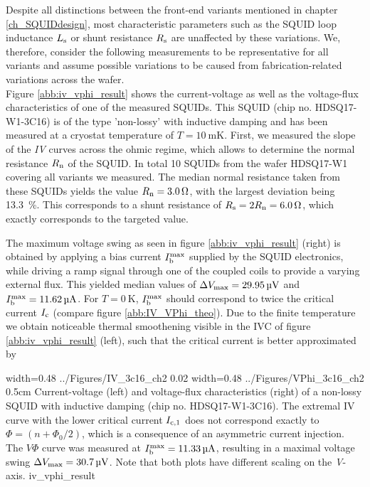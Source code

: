 Despite all distinctions between the front-end variants mentioned in chapter \ref{ch_SQUIDdesign}, most characteristic parameters such as the SQUID loop inductance $L_{\rm s}$ or shunt resistance $R_{\rm s}$ are unaffected by these variations. We, therefore, consider the following measurements to be representative for all variants and assume possible variations to be caused from fabrication-related variations across the wafer. \\
Figure \ref{abb:iv_vphi_result} shows the current-voltage as well as the voltage-flux characteristics of one of the measured SQUIDs. This SQUID (chip no. HDSQ17-W1-3C16) is of the type 'non-lossy' with inductive damping and has been measured at a cryostat temperature of $T=\qty{10}{\milli\kelvin}$. First, we measured the slope of the \textit{IV} curves across the ohmic regime, which allows to determine the normal resistance $R_{\rm n}$ of the SQUID. In total 10 SQUIDs from the wafer HDSQ17-W1 covering all variants we measured. The median normal resistance taken from these SQUIDs yields the value $R_{\rm n}=\qty{3.0}{\ohm}$, with the largest deviation being \qty{13.3}{\percent}. This corresponds to a shunt resistance of $R_{\rm s}=2R_{\rm n}=\qty{6.0}{\ohm}$, which exactly corresponds to the targeted value. 

The maximum voltage swing as seen in figure \ref{abb:iv_vphi_result} (right) is obtained by applying a bias current $I_{\rm b}^{\rm max}$ supplied by the SQUID electronics, while driving a ramp signal through one of the coupled coils to provide a varying external flux. This yielded median values of $\Delta V_{\rm max}=\qty{29.95}{\micro\volt}$ and $I_{\rm b}^{\rm max}=\qty{11.62}{\micro\ampere}$. For $T=\qty{0}{\kelvin}$, $I_{\rm b}^{\rm max}$ should correspond to twice the critical current $I_{\rm c}$ (compare figure \ref{abb:IV_VPhi_theo}). Due to the finite temperature we obtain noticeable thermal smoothening visible in the IVC of figure \ref{abb:iv_vphi_result} (left), such that the critical current is better approximated by \cite{Drung1996}

{width=0.48\textwidth}
{../Figures/IV_3c16_ch2}
{0.02\textwidth} %
{width=0.48\textwidth}
{../Figures/VPhi_3c16_ch2}
{0.5cm} %
{Current-voltage (left) and voltage-flux characteristics (right) of a non-lossy SQUID with inductive damping (chip no. HDSQ17-W1-3C16). 
The extremal IV curve with the lower critical current $I_{\rm c,1}$ does not correspond exactly to \\ $\Phi = (n+\Phi_0/2)$, which is a consequence of an asymmetric current injection.
The $V\Phi$ curve was measured at $I_{\rm b}^{\rm max}=\qty{11.33}{\uA}$, resulting in a maximal voltage swing $\Delta V_{\rm max}=\qty{30.7}{\uV}$. Note that both plots have different scaling on the \textit{V}-axis.}
{iv_vphi_result}


